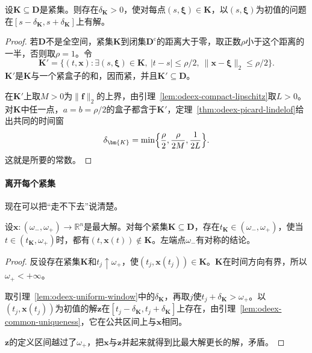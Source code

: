 \begin{lemma}[紧集上的统一时间窗]
\label{lem:odeex-uniform-window}
设$\bm{K}\subseteq\bm{D}$是紧集。则存在$\delta_{\bm{K}}>0$，使对每点$(s,\bm{\xi})\in\bm{K}$，以$(s,\bm{\xi})$为初值的问题在$[s-\delta_{\bm{K}},s+\delta_{\bm{K}}]$上有解。
\end{lemma}

\begin{proof}
若$\bm{D}$不是全空间，紧集$\bm{K}$到闭集$\bm{D}^{\mathrm{c}}$的距离大于零，取正数$\rho$小于这个距离的一半，否则取$\rho=1$。令
\[
 \bm{K}'=\bigl\{(t,\bm{x}):\exists(s,\bm{\xi})\in\bm{K},\ \lvert t-s\rvert\leq\rho/2,\ \lVert\bm{x}-\bm{\xi}\rVert_2\leq\rho/2\bigr\}.
\]
$\bm{K}'$是$\bm{K}$与一个紧盒子的和，因而紧，并且$\bm{K}'\subseteq\bm{D}$。

在$\bm{K}'$上取$M>0$为$\lVert\bm{f}\rVert_2$的上界，由引理~\ref{lem:odeex-compact-lipschitz}取$L>0$。对$\bm{K}$中任一点，$a=b=\rho/2$的盒子都含于$\bm{K}'$，定理~\ref{thm:odeex-picard-lindelof}给出共同的时间窗
\[
 \delta_{\bm{K}}=\min\Bigl\{\frac{\rho}{2},\frac{\rho}{2M},\frac{1}{2L}\Bigr\}.
\]
这就是所要的常数。
\end{proof}

\paragraph{离开每个紧集}
现在可以把“走不下去”说清楚。

\begin{theorem}[最大解离开紧集]
\label{thm:odeex-escape}
设$\bm{x}:(\omega_-,\omega_+)\to\mathbb{R}^{n}$是最大解。对每个紧集$\bm{K}\subseteq\bm{D}$，存在$t_{\bm{K}}\in(\omega_-,\omega_+)$，使当$t\in(t_{\bm{K}},\omega_+)$时，都有$(t,\bm{x}(t))\notin\bm{K}$。左端点$\omega_-$有对称的结论。
\end{theorem}

\begin{proof}
反设存在紧集$\bm{K}$和$t_j\uparrow\omega_+$，使$(t_j,\bm{x}(t_j))\in\bm{K}$。$\bm{K}$在时间方向有界，所以$\omega_+<+\infty$。

取引理~\ref{lem:odeex-uniform-window}中的$\delta_{\bm{K}}$，再取$j$使$t_j+\delta_{\bm{K}}>\omega_+$。以$(t_j,\bm{x}(t_j))$为初值的解$\bm{z}$在$[t_j-\delta_{\bm{K}},t_j+\delta_{\bm{K}}]$上存在，由引理~\ref{lem:odeex-common-uniqueness}，它在公共区间上与$\bm{x}$相同。

$\bm{z}$的定义区间越过了$\omega_+$，把$\bm{x}$与$\bm{z}$并起来就得到比最大解更长的解，矛盾。
\end{proof}

